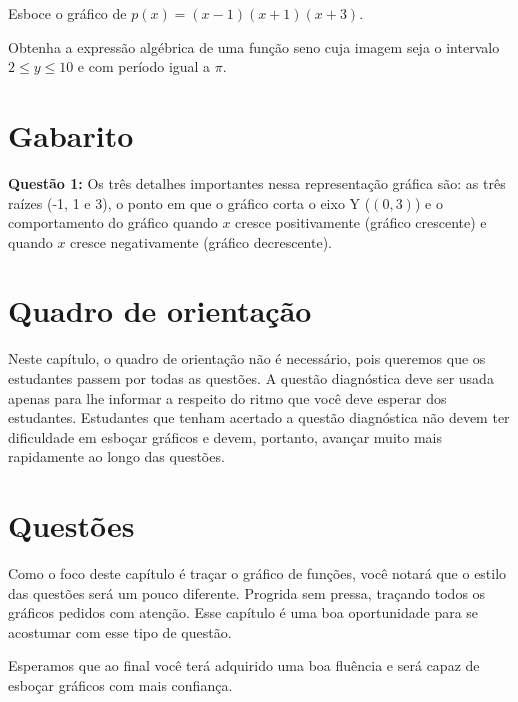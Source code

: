 \documentclass[main.tex]{subfiles}
\begin{document}
\begin{diagnostico}
Esboce o gráfico de $p(x)=(x-1)(x+1)(x+3)$.
\end{diagnostico}

\begin{diagnostico}
Obtenha a expressão algébrica de uma função seno cuja imagem seja o intervalo $2\leq y \leq 10$ e com período igual a $\pi$.
\end{diagnostico}

\paraTutores

\section{Gabarito}

\textbf{Questão 1:} Os três detalhes importantes nessa representação gráfica são: as três raízes (-1, 1 e 3), o ponto em que o gráfico corta o eixo Y ($(0,3)$) e o comportamento do gráfico quando $x$ cresce positivamente (gráfico crescente) e quando $x$ cresce negativamente (gráfico decrescente).

\section{Quadro de orientação}

Neste capítulo, o quadro de orientação não é necessário, pois queremos que os estudantes passem por todas as questões. A questão diagnóstica deve ser usada apenas para lhe informar a respeito do ritmo que você deve esperar dos estudantes. Estudantes que tenham acertado a questão diagnóstica não devem ter dificuldade em esboçar gráficos e devem, portanto, avançar muito mais rapidamente ao longo das questões.

\paraAmbos

\newpage

\section{Questões}

Como o foco deste capítulo é traçar o gráfico de funções, você notará que o estilo das questões será um pouco diferente. Progrida sem pressa, traçando todos os gráficos pedidos com atenção. Esse capítulo é uma boa oportunidade para se acostumar com esse tipo de questão.

Esperamos que ao final você terá adquirido uma boa fluência e será capaz de esboçar gráficos com mais confiança.
\end{document}
